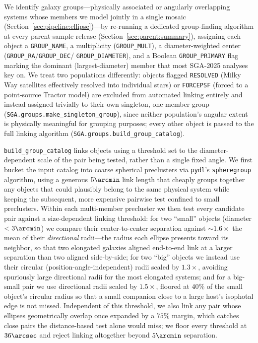 \documentclass[modern,linenumbers]{aastex701}
\begin{document}
We identify galaxy groups---physically associated or angularly
overlapping systems whose members we model jointly in a single mosaic
(Section~\ref{sec:pipeline:ellipse})---by re-running a dedicated
group-finding algorithm at every parent-sample release
(Section~\ref{sec:parent:summary}), assigning each object a
\texttt{GROUP\_NAME}, a multiplicity (\texttt{GROUP\_MULT}), a
diameter-weighted center (\texttt{GROUP\_RA}/\texttt{GROUP\_DEC}/
\texttt{GROUP\_DIAMETER}), and a Boolean \texttt{GROUP\_PRIMARY} flag
marking the dominant (largest-diameter) member that most SGA-2025
analyses key on. We treat two populations differently: objects flagged
\texttt{RESOLVED} (Milky Way satellites effectively resolved into
individual stars) or \texttt{FORCEPSF} (forced to a point-source
Tractor model) are excluded from automated linking entirely and instead
assigned trivially to their own singleton, one-member group
(\texttt{SGA.groups.make\_singleton\_group}), since neither
population's angular extent is physically meaningful for grouping
purposes; every other object is passed to the full linking algorithm
(\texttt{SGA.groups.build\_group\_catalog}).

\texttt{build\_group\_catalog} links objects using a threshold set to
the diameter-dependent scale of the pair being tested, rather than a
single fixed angle. We first bucket the input catalog into coarse
spherical preclusters via \texttt{pydl}'s \texttt{spheregroup}
algorithm, using a generous $5\arcmin$ link length that cheaply groups
together any objects that could plausibly belong to the same physical
system while keeping the subsequent, more expensive pairwise test
confined to small preclusters. Within each multi-member precluster we
then test every candidate pair against a size-dependent linking
threshold: for two ``small'' objects (diameter $<3\arcmin$) we compare
their center-to-center separation against $\sim\!1.6\times$ the mean of
their \emph{directional} radii---the radius each ellipse presents
toward its neighbor, so that two elongated galaxies aligned end-to-end
link at a larger separation than two aligned side-by-side; for two
``big'' objects we instead use their circular (position-angle-independent)
radii scaled by $1.3\times$, avoiding spuriously large directional radii
for the most elongated systems; and for a big-small pair we use
directional radii scaled by $1.5\times$, floored at $40\%$ of the small
object's circular radius so that a small companion close to a large
host's isophotal edge is not missed. Independent of this
threshold, we also link any pair whose ellipses geometrically overlap
once expanded by a $75\%$ margin, which catches close pairs the
distance-based test alone would miss; we floor every threshold at
$36\arcsec$ and reject linking altogether beyond $5\arcmin$ separation.
\end{document}
